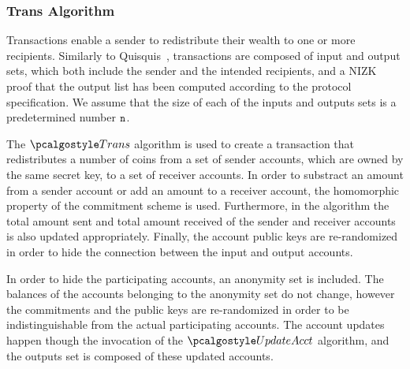 \subsubsection{Trans Algorithm}
Transactions enable a sender to redistribute their wealth to one or more recipients.
Similarly to Quisquis~\cite{fauzi2019quisquis}, transactions are composed of input and output sets, which both include the sender and the intended recipients, and a NIZK proof that the output list has been computed according to the protocol specification. We assume that the size of each of the inputs and outputs sets is a predetermined number ${\textup{\texttt{n}}}$.



The $\trans$ algorithm is used to create a transaction that redistributes a number of coins from a set of sender accounts, which are owned by the same secret key, to a set of receiver accounts. In order to substract an amount from a sender account or add an amount to a receiver account, the homomorphic property of the commitment scheme is used. Furthermore, in the algorithm the total amount sent and total amount received of the sender and receiver accounts is also updated appropriately. Finally, the account public keys are re-randomized in order to hide the connection between the input and output accounts.

In order to hide the participating accounts, an anonymity set is included. The balances of the accounts belonging to the anonymity set do not change, however the commitments and the public keys are re-randomized in order to be indistinguishable from the actual participating accounts. 
The account updates happen though the invocation of the $\updacc$ algorithm, and the outputs set is composed of these updated accounts.

